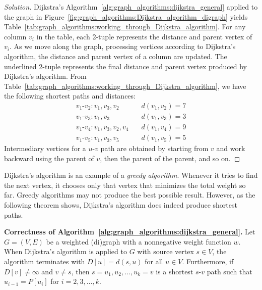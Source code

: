 \begin{proof}[Solution]
Dijkstra's Algorithm~\ref{alg:graph_algorithms:dijkstra_general}
applied to the graph in
Figure~\ref{fig:graph_algorithms:Dijkstra_algorithm_digraph} yields
Table~\ref{tab:graph_algorithms:working_through_Dijkstra_algorithm}. For
any column $v_i$ in the table, each 2-tuple represents the
distance and parent vertex of $v_i$. As we move along
the graph, processing vertices according to Dijkstra's
algorithm, the distance and parent vertex
of a column are updated. The underlined 2-tuple represents the final
distance and parent vertex produced by Dijkstra's algorithm. From
Table~\ref{tab:graph_algorithms:working_through_Dijkstra_algorithm},
we have the following shortest paths and distances:
\[
\begin{array}{ll}
v_1\text{-}v_2: v_1, v_3, v_2      &\quad d(v_1, v_2) = 7 \\[4pt]
v_1\text{-}v_3: v_1, v_3           &\quad d(v_1, v_3) = 3 \\[4pt]
v_1\text{-}v_4: v_1, v_3, v_2, v_4 &\quad d(v_1, v_4) = 9 \\[4pt]
v_1\text{-}v_5: v_1, v_3, v_5      &\quad d(v_1, v_5) = 5
\end{array}
\]
Intermediary vertices for a $u$-$v$ path are obtained by starting from
$v$ and work backward using the parent of $v$, then the parent of the
parent, and so on.
\end{proof}

Dijkstra's algorithm is an example of a
\emph{greedy algorithm}. Whenever it tries to
find the next vertex, it chooses only that vertex that minimizes the
total weight so far. Greedy
algorithms may not produce the best possible
result. However, as the following theorem shows, Dijkstra's
algorithm does indeed produce shortest
paths.

\begin{theorem}
\textbf{Correctness of
  Algorithm~\ref{alg:graph_algorithms:dijkstra_general}.}
Let $G = (V, E)$ be a weighted (di)graph with a nonnegative
weight function $w$. When Dijkstra's
algorithm is applied to $G$ with source
vertex $s \in V$, the algorithm terminates with $D[u] = d(s,u)$ for
all $u \in V$. Furthermore, if $D[v] \neq \infty$ and $v \neq s$, then
$s=u_1, u_2, \dots, u_k = v$ is a shortest $s$-$v$ path such that
$u_{i-1} = P[u_i]$ for $i = 2,3,\dots,k$.
\end{theorem}

